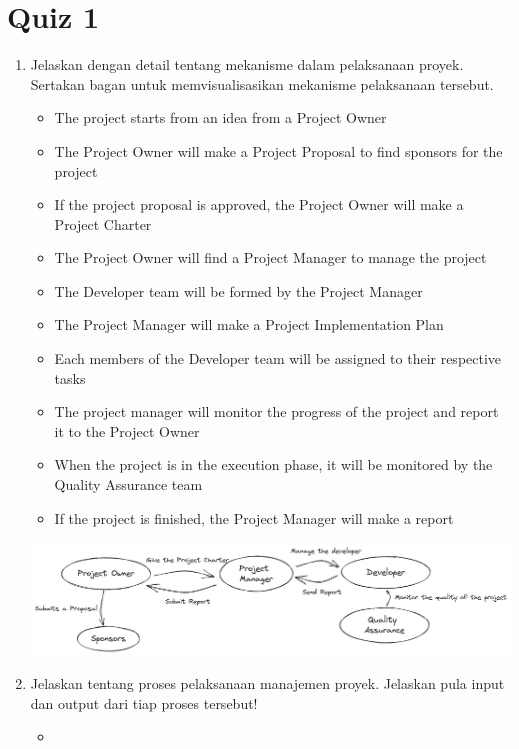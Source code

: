 \documentclass[12pt,titlepage]{article}
\begin{document}
\section{Quiz 1}
\begin{enumerate}
    \item {
        Jelaskan dengan detail tentang mekanisme dalam pelaksanaan proyek.
        Sertakan bagan untuk memvisualisasikan mekanisme pelaksanaan tersebut.
        \begin{itemize}
            \item The project starts from an idea from a Project Owner
            \item The Project Owner will make a Project Proposal to find sponsors for the project
            \item If the project proposal is approved, the Project Owner will make a Project Charter
            \item The Project Owner will find a Project Manager to manage the project
            \item The Developer team will be formed by the Project Manager
            \item The Project Manager will make a Project Implementation Plan
            \item Each members of the Developer team will be assigned to their respective tasks
            \item The project manager will monitor the progress of the project and report it to the Project Owner
            \item When the project is in the execution phase, it will be monitored by the Quality Assurance team
            \item If the project is finished, the Project Manager will make a report
        \end{itemize}
        \includegraphics[height=3cm]{./images/project-flow.png}
    }
    \pagebreak
    \item {
        Jelaskan tentang proses pelaksanaan manajemen proyek.
        Jelaskan pula input dan output dari tiap proses tersebut! 
        \begin{itemize}
            \item {
}
\end{itemize}}
\end{enumerate}
\end{document}
